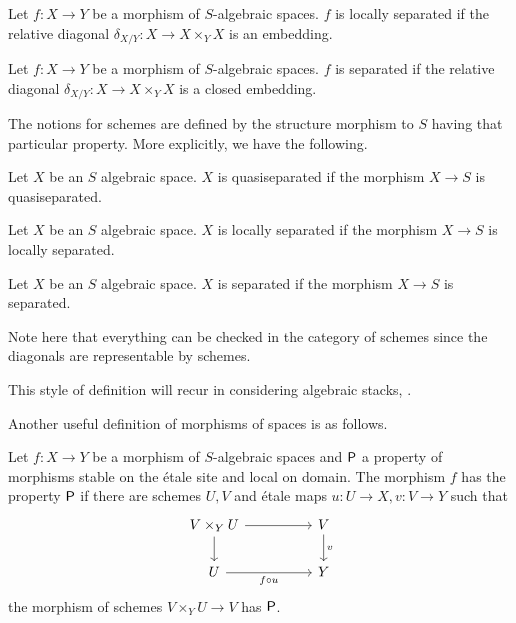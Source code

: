 \begin{definition}\label{def: locally separated morphism of spaces}
    Let $f:X\to Y$ be a morphism of $S$-algebraic spaces. $f$ is locally separated if the relative diagonal $\delta_{X/Y}:X\to X\times_{Y}X$ is an embedding.
\end{definition}
\begin{definition}\label{def: separated morphism of spaces}
    Let $f:X\to Y$ be a morphism of $S$-algebraic spaces. $f$ is separated if the relative diagonal $\delta_{X/Y}:X\to X\times_{Y}X$ is a closed embedding.
\end{definition}
The notions for schemes are defined by the structure morphism to $S$ having that particular property. More explicitly, we have the following. 
\begin{definition}\label{def: quasiseparated space}
    Let $X$ be an $S$ algebraic space. $X$ is quasiseparated if the morphism $X\to S$ is quasiseparated.
\end{definition}
\begin{definition}\label{def: locally separated space}
    Let $X$ be an $S$ algebraic space. $X$ is locally separated if the morphism $X\to S$ is locally separated.
\end{definition}
\begin{definition}\label{def: separated space}
    Let $X$ be an $S$ algebraic space. $X$ is separated if the morphism $X\to S$ is separated. 
\end{definition}
\begin{remark}
    Note here that everything can be checked in the category of schemes since the diagonals are representable by schemes. 
\end{remark}
\begin{remark}
    This style of definition will recur in considering algebraic stacks, .
\end{remark}
Another useful definition of morphisms of spaces is as follows. 
\begin{definition}\label{def: property of spaces via schemes}
    Let $f:X\to Y$ be a morphism of $S$-algebraic spaces and $\mathsf{P}$ a property of morphisms stable on the \'{e}tale site and local on domain. The morphism $f$ has the property $\mathsf{P}$ if there are schemes $U,V$ and \'{e}tale maps $u:U\to X, v:V\to Y$ such that 
    $$%
    \begin{tikzcd}
        {V\times_{Y}U} && V \\
        U && Y
        \arrow["{f\circ u}"', from=2-1, to=2-3]
        \arrow["v", from=1-3, to=2-3]
        \arrow[from=1-1, to=2-1]
        \arrow[from=1-1, to=1-3]
    \end{tikzcd}$$
    the morphism of schemes $V\times_{Y}U\to V$ has $\mathsf{P}$.
\end{definition}
